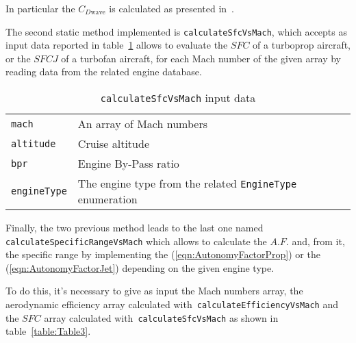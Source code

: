 \bigskip
\noindent
In particular the $C_{D\text{wave}}$ is calculated as presented in~\cite{hilton1951high}.

\bigskip
\noindent
The second static method implemented is \lstinline[language=Java]!calculateSfcVsMach!, which accepts as input data reported in table~\ref{table:Table2} allows to evaluate the $SFC$ of a turboprop aircraft, or the $SFCJ$ of a turbofan aircraft, for each Mach number of the given array by reading data from the related engine database.

\begin{table}[t]
\begin{tabular}{p{7cm}p{7.5cm}}
\toprule
\lstinline[language=Java]!mach!	& An array of Mach numbers \\[0.1cm]
\lstinline[language=Java]!altitude! & Cruise altitude \\[0.1cm]
\lstinline[language=Java]!bpr! & Engine By-Pass ratio \\[0.1cm]
\lstinline[language=Java]!engineType! & The engine type from the related \lstinline[language=Java]!EngineType! enumeration \\
\bottomrule
\end{tabular}
\caption{ \lstinline[language=Java]!calculateSfcVsMach! input data}
\label{table:Table2}
\end{table}

\bigskip
\noindent
Finally, the two previous method leads to the last one named \lstinline[language=Java]!calculateSpecificRangeVsMach! which allows to calculate the $A.F.$ and, from it, the specific range by implementing the (\ref{eqn:AutonomyFactorProp}) or the (\ref{eqn:AutonomyFactorJet}) depending on the given engine type. 

To do this, it's necessary to give as input the Mach numbers array, the aerodynamic efficiency array calculated with~\lstinline[language=Java]!calculateEfficiencyVsMach! and the $SFC$ array calculated with~\lstinline[language=Java]!calculateSfcVsMach! as shown in table~\ref{table:Table3}.

